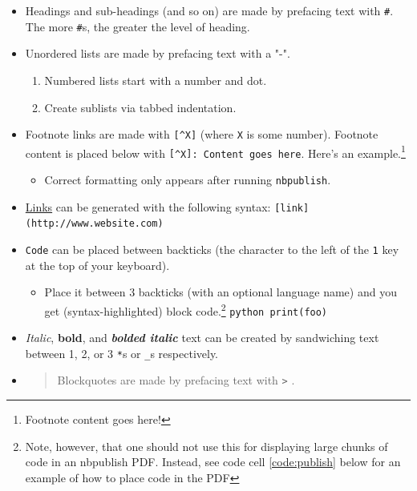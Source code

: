 \documentclass[10pt,parskip=half,
	toc=sectionentrywithdots,
	bibliography=totocnumbered,
	captions=tableheading,
    numbers=noendperiod,
    headings=standardclasses]{scrartcl}
\providecommand{\tightlist}{%
  \setlength{\itemsep}{0pt}\setlength{\parskip}{0pt}}
\begin{document}
\begin{itemize}
\item
  Headings and sub-headings (and so on) are made by prefacing text with
  \texttt{\#}. The more \texttt{\#}s, the greater the level of heading.
\item
  Unordered lists are made by prefacing text with a "-".

  \begin{enumerate}
  \def\labelenumi{\arabic{enumi}.}
  \tightlist
  \item
    Numbered lists start with a number and dot.
  \item
    Create sublists via tabbed indentation.
  \end{enumerate}
\item
  Footnote links are made with \texttt{{[}\^{}X{]}} (where \texttt{X} is
  some number). Footnote content is placed below with
  \texttt{{[}\^{}X{]}:\ Content\ goes\ here}. Here's an
  example.\footnote{\hphantom{} Footnote content goes here!}

  \begin{itemize}
  \tightlist
  \item
    Correct formatting only appears after running \texttt{nbpublish}.
  \end{itemize}
\item
  \href{https://google.com}{Links} can be generated with the following
  syntax: \texttt{{[}link{]}(http://www.website.com)}
\item
  \texttt{Code} can be placed between backticks (the character to the
  left of the \texttt{1} key at the top of your keyboard).

  \begin{itemize}
  \tightlist
  \item
    Place it between 3 backticks (with an optional language name) and
    you get (syntax-highlighted) block code.\footnote{\hphantom{} Note,
      however, that one should not use this for displaying large chunks
      of code in an nbpublish PDF. Instead, see code cell
      \cref{code:publish} below for an example of how to place code in
      the PDF} \texttt{python\ print(foo)}
  \end{itemize}
\item
  \emph{Italic}, \textbf{bold}, and \textbf{\emph{bolded italic}} text
  can be created by sandwiching text between 1, 2, or 3 \texttt{*}s or
  \texttt{\_}s respectively.
\item
  \begin{quote}
  Blockquotes are made by prefacing text with \texttt{\textgreater{}} .
  \end{quote}
\end{itemize}
\end{document}
